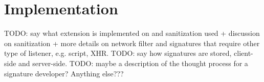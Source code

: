 \section{Implementation}

TODO: say what extension is implemented on and sanitization used + discussion on sanitization + more details on network filter and signatures that require other type of listener, e.g. script, XHR.
TODO: say how signatures are stored, client-side and server-side.
TODO: maybe a description of the thought process for a signature developer?
Anything else???